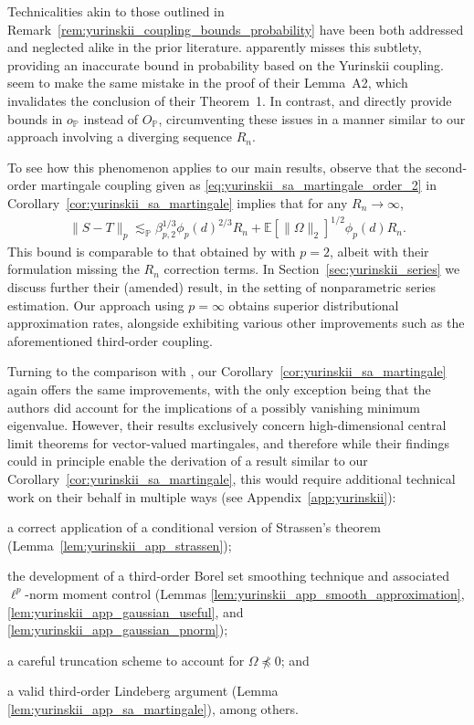 \documentclass[11pt,lof]{puthesis}
\renewcommand{\P}{\ensuremath{\mathbb{P}}}
\newcommand{\E}{\ensuremath{\mathbb{E}}}
\theoremstyle{break}
\theoremstyle{proof}
\begin{document}
Technicalities akin to those outlined in
Remark~\ref{rem:yurinskii_coupling_bounds_probability} have been both addressed
and neglected alike in the prior literature. \citet[Chapter 10.4, Example
16]{pollard2002user} apparently misses this subtlety, providing an inaccurate
bound in probability based on the Yurinskii coupling.
\citet{li2020uniform} seem to make the same mistake in the proof of their
Lemma~A2, which invalidates the conclusion of their Theorem~1. In contrast,
\citet{belloni2015some} and \citet{belloni2019conditional} directly provide
bounds in $o_\P$ instead of $O_\P$, circumventing these issues in a manner
similar to our approach involving a diverging sequence $R_n$.

To see how this phenomenon applies to our main results, observe that the
second-order martingale coupling given as
\eqref{eq:yurinskii_sa_martingale_order_2} in
Corollary~\ref{cor:yurinskii_sa_martingale} implies that for any
$R_n \to \infty$,
%
\begin{align*}
  \|S - T\|_p
  \lesssim_\P
  \beta_{p,2}^{1/3}
  \phi_p(d)^{2/3} R_n
  + \E[\|\Omega\|_2]^{1/2}
  \phi_p(d) R_n.
\end{align*}
%
This bound is comparable to that obtained by \citet[Theorem~1]{li2020uniform}
with $p=2$, albeit with their formulation missing the $R_n$ correction terms.
In Section~\ref{sec:yurinskii_series} we discuss further their (amended)
result, in the
setting of nonparametric series estimation. Our approach using
$p = \infty$ obtains superior distributional approximation rates, alongside
exhibiting various other improvements such as the aforementioned third-order
coupling.

Turning to the comparison with \citet{belloni2018high}, our
Corollary~\ref{cor:yurinskii_sa_martingale} again offers the same improvements,
with the
only exception being that the authors did account for the implications of a
possibly vanishing minimum eigenvalue. However, their results exclusively
concern high-dimensional central limit theorems for vector-valued martingales,
and therefore while their findings
could in principle enable the derivation of a result similar to our
Corollary~\ref{cor:yurinskii_sa_martingale}, this would require additional
technical work
on their behalf in multiple ways
(see Appendix~\ref{app:yurinskii}):
%
\begin{inlineroman}
  \item a correct application of a conditional
    version of Strassen's theorem
    (Lemma~\ref{lem:yurinskii_app_strassen});
  \item the development of a third-order Borel set smoothing technique and
    associated $\ell^p$-norm moment control
    (Lemmas \ref{lem:yurinskii_app_smooth_approximation},
      \ref{lem:yurinskii_app_gaussian_useful},
    and \ref{lem:yurinskii_app_gaussian_pnorm});
  \item a careful truncation scheme to account for
    $\Omega\npreceq0$; and
  \item a valid third-order Lindeberg argument
    (Lemma \ref{lem:yurinskii_app_sa_martingale}),
    among others.
\end{inlineroman}
\end{document}
